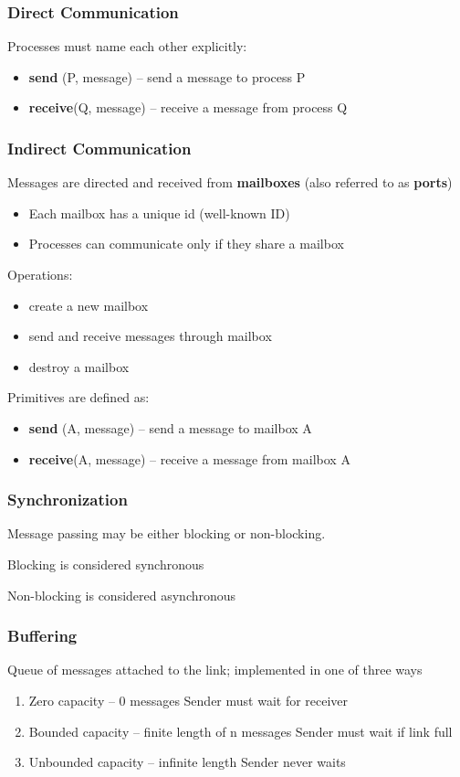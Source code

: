\subsubsection{Direct Communication}
Processes must name each other explicitly:
\begin{itemize}\small
    \item \textbf{send} (P, message) – send a message to process P
    \item \textbf{receive}(Q, message) – receive a message from process Q
\end{itemize}

\subsubsection{Indirect Communication}
Messages are directed and received from \textbf{mailboxes} (also referred to as \textbf{ports})
\begin{itemize}
    \item Each mailbox has a unique id (well-known ID)
    \item Processes can communicate only if they share a mailbox
\end{itemize}

Operations:
\begin{itemize}
    \item create a new mailbox
    \item send and receive messages through mailbox
    \item destroy a mailbox
\end{itemize}

Primitives are defined as:
\begin{itemize}\small
    \item \textbf{send} (A, message) – send a message to mailbox A
    \item \textbf{receive}(A, message) – receive a message from mailbox A
\end{itemize}

\subsubsection{Synchronization}
Message passing may be either blocking or non-blocking.

Blocking is considered synchronous

Non-blocking is considered asynchronous

\subsubsection{Buffering}
Queue of messages attached to the link; implemented in one of three ways
\begin{enumerate}
    \item Zero capacity – 0 messages
    \subitem Sender must wait for receiver
    \item Bounded capacity – finite length of n messages
    \subitem Sender must wait if link full
    \item Unbounded capacity – infinite length
    \subitem Sender never waits
\end{enumerate}
